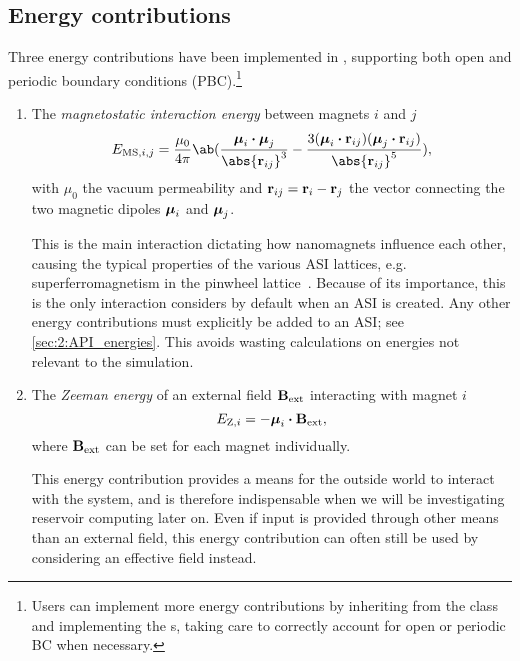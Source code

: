 \subsection{Energy contributions}
Three energy contributions have been implemented in \hotspice, supporting both open and periodic boundary conditions (PBC).\footnote{
	Users can implement more energy contributions by inheriting from the  class and implementing the s, taking care to correctly account for open or periodic BC when necessary.
}
\begin{enumerate}
	\item The \textit{magnetostatic interaction energy} between magnets $i$ and $j$
	\begin{equation}
		\label{eq:2:E_MS}
		E_{\mathrm{MS},i,j} = \frac{\mu_0}{4 \pi} \ab(\frac{\vc{\mu}_i \bcdot \vc{\mu}_j}{\abs{\vc{r}_{ij}}^3} - \frac{3(\vc{\mu}_i \bcdot \vc{r}_{ij}) (\vc{\mu}_j \bcdot \vc{r}_{ij})}{\abs{\vc{r}_{ij}}^5}) \mathrm{,}
	\end{equation}
	with $\mu_0$ the vacuum permeability and $\boldsymbol{\mathbf{r}}_{ij} = \boldsymbol{\mathbf{r}}_i - \boldsymbol{\mathbf{r}}_j$ the vector connecting the two magnetic dipoles $\boldsymbol{\mathbf{\mu}}_i$ and $\boldsymbol{\mathbf{\mu}}_j$. \par
	This is the main interaction dictating how nanomagnets influence each other, causing the typical properties of the various ASI lattices, e.g. superferromagnetism in the pinwheel lattice~\cite{li2018pinwheel}.
	Because of its importance, this is the only interaction \hotspice considers by default when an ASI is created.
	Any other energy contributions must explicitly be added to an ASI; see \cref{sec:2:API_energies}.
	This avoids wasting calculations on energies not relevant to the simulation.
	
	\item The \textit{Zeeman energy} of an external field $\boldsymbol{\mathbf{B}}_\mathrm{ext}$ interacting with magnet $i$
	\begin{equation}
		\label{eq:2:E_Z}
		E_{\mathrm{Z},i} = -\boldsymbol{\mathbf{\mu}}_i \boldsymbol{\cdot} \boldsymbol{\mathbf{B}}_\mathrm{ext} \mathrm{,}
	\end{equation}
	where $\boldsymbol{\mathbf{B}}_\mathrm{ext}$ can be set for each magnet individually. \par
	This energy contribution provides a means for the outside world to interact with the system, and is therefore indispensable when we will be investigating reservoir computing later on.
	Even if input is provided through other means than an external field, this energy contribution can often still be used by considering an effective field instead.
	

\end{enumerate}
